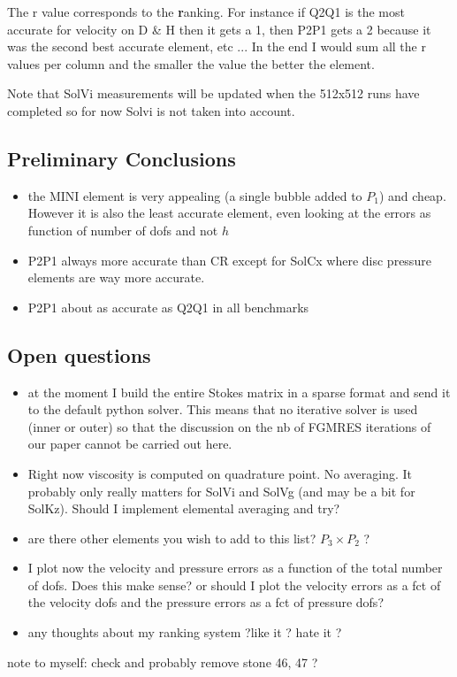 The r value corresponds to the \textbf{r}anking. For instance if Q2Q1 is the most accurate for velocity on D \& H then it gets a 1, then P2P1 gets a 2 because it was the second best accurate element, etc ...
In the end I would sum all the r values per column 
and the smaller the value the better the element. 

Note that SolVi measurements will be updated when the 512x512 runs have completed so for now Solvi is not 
taken into account.







\subsection*{Preliminary Conclusions}

\begin{itemize}
\item the MINI element is very appealing (a single bubble added to $P_1$) and cheap. However it is also 
the least accurate element, even looking at the errors as function of number of dofs and not $h$
\item P2P1 always more accurate than CR except for SolCx where disc pressure elements are way more accurate.
\item P2P1 about as accurate as Q2Q1 in all benchmarks
\end{itemize}


\subsection*{Open questions}

\begin{itemize}
\item at the moment I build the entire Stokes matrix in a sparse format and send it to the default 
python solver. This means that no iterative solver is used (inner or outer) so that the discussion 
on the nb of FGMRES iterations of our paper cannot be carried out here. 
\item Right now viscosity is computed on quadrature point. No averaging. It probably only really matters 
for SolVi and SolVg (and may be a bit for SolKz). Should I implement elemental averaging and try?  
\item are there other elements you wish to add to this list? $P_3\times P_2$ ? 
\item I plot now the velocity and pressure errors as a function of the total number of dofs. 
Does this make sense? or should I plot the velocity errors as a fct of the velocity dofs and 
the pressure errors  as a fct of pressure dofs?
\item any thoughts about my ranking system ?like it ? hate it ?
\end{itemize}

\vspace{0.5cm}

note to myself: check and probably remove stone 46, 47 ?
